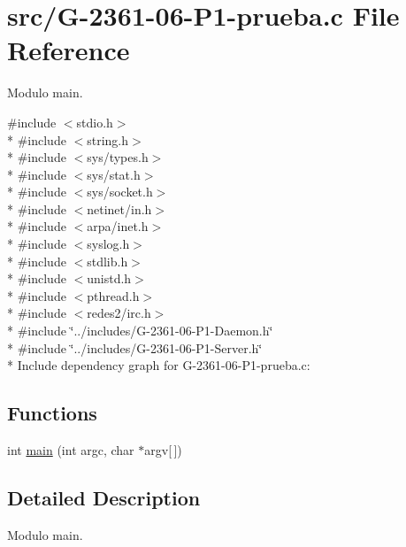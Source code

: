 \hypertarget{_g-2361-06-_p1-prueba_8c}{}\section{src/\+G-\/2361-\/06-\/\+P1-\/prueba.c File Reference}
\label{_g-2361-06-_p1-prueba_8c}


Modulo main.  


{\ttfamily \#include $<$stdio.\+h$>$}\\*
{\ttfamily \#include $<$string.\+h$>$}\\*
{\ttfamily \#include $<$sys/types.\+h$>$}\\*
{\ttfamily \#include $<$sys/stat.\+h$>$}\\*
{\ttfamily \#include $<$sys/socket.\+h$>$}\\*
{\ttfamily \#include $<$netinet/in.\+h$>$}\\*
{\ttfamily \#include $<$arpa/inet.\+h$>$}\\*
{\ttfamily \#include $<$syslog.\+h$>$}\\*
{\ttfamily \#include $<$stdlib.\+h$>$}\\*
{\ttfamily \#include $<$unistd.\+h$>$}\\*
{\ttfamily \#include $<$pthread.\+h$>$}\\*
{\ttfamily \#include $<$redes2/irc.\+h$>$}\\*
{\ttfamily \#include \char`\"{}../includes/\+G-\/2361-\/06-\/\+P1-\/\+Daemon.\+h\char`\"{}}\\*
{\ttfamily \#include \char`\"{}../includes/\+G-\/2361-\/06-\/\+P1-\/\+Server.\+h\char`\"{}}\\*
Include dependency graph for G-\/2361-\/06-\/\+P1-\/prueba.c\+:
\subsection*{Functions}
\begin{DoxyCompactItemize}
\item 
int \hyperlink{_g-2361-06-_p1-prueba_8c_a0ddf1224851353fc92bfbff6f499fa97}{main} (int argc, char $\ast$argv\mbox{[}$\,$\mbox{]})
\end{DoxyCompactItemize}


\subsection{Detailed Description}
Modulo main. 

